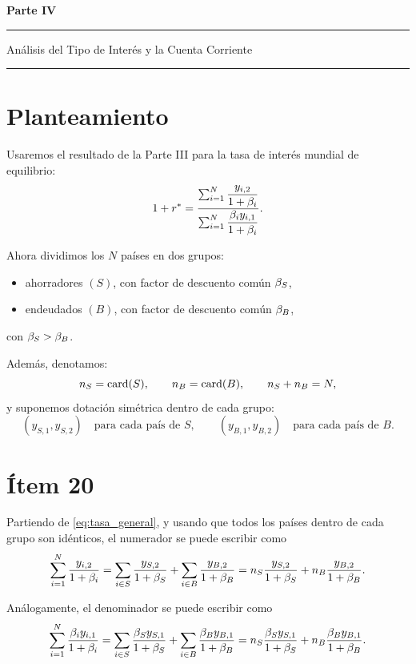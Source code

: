 \begin{center}
    {\LARGE \textbf{Parte IV}}\\[6pt]
\end{center}
\vspace{4pt}\hrule\vspace{10pt}

{\large Análisis del Tipo de Interés y la Cuenta Corriente \par}

\vspace{0.1cm}
\noindent\rule{\textwidth}{0.5pt}
\vspace{0.1cm}

\section*{Planteamiento}
Usaremos el resultado de la Parte III para la tasa de interés mundial de equilibrio:
\begin{equation}
1 + r^* = \frac{\sum_{i=1}^{N} \dfrac{y_{i,2}}{1+\beta_i}}{\sum_{i=1}^{N} \dfrac{\beta_i y_{i,1}}{1+\beta_i}}.
\label{eq:tasa_general}
\end{equation}

Ahora dividimos los $N$ países en dos grupos:
\begin{itemize}[leftmargin=1.2cm]
    \item ahorradores $(S)$, con factor de descuento común $\beta_S$,
    \item endeudados $(B)$, con factor de descuento común $\beta_B$,
\end{itemize}
con $\beta_S > \beta_B$.

Además, denotamos:
\[
n_S = \operatorname{card}(S), \qquad n_B = \operatorname{card}(B), \qquad n_S + n_B = N,
\]
y suponemos dotación simétrica dentro de cada grupo:
\[
(y_{S,1},y_{S,2}) \quad \text{para cada país de } S,
\qquad
(y_{B,1},y_{B,2}) \quad \text{para cada país de } B.
\]

\section*{Ítem 20}

Partiendo de \eqref{eq:tasa_general}, y usando que todos los países dentro de cada grupo son idénticos, el numerador se puede escribir como
\[
\sum_{i=1}^{N} \frac{y_{i,2}}{1+\beta_i}
=
\sum_{i \in S} \frac{y_{S,2}}{1+\beta_S}
+
\sum_{i \in B} \frac{y_{B,2}}{1+\beta_B}
=
n_S \frac{y_{S,2}}{1+\beta_S} + n_B \frac{y_{B,2}}{1+\beta_B}.
\]

Análogamente, el denominador se puede escribir como
\[
\sum_{i=1}^{N} \frac{\beta_i y_{i,1}}{1+\beta_i}
=
\sum_{i \in S} \frac{\beta_S y_{S,1}}{1+\beta_S}
+
\sum_{i \in B} \frac{\beta_B y_{B,1}}{1+\beta_B}
=
n_S \frac{\beta_S y_{S,1}}{1+\beta_S} + n_B \frac{\beta_B y_{B,1}}{1+\beta_B}.
\]

